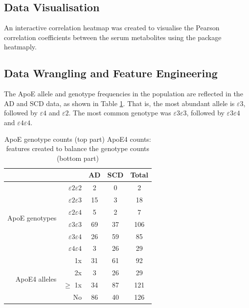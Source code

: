 \documentclass{amsart}
\begin{document}
\subsection{Data Visualisation}
An interactive correlation heatmap was created to visualise the Pearson correlation coefficients between the serum metabolites using the package \textsf{heatmaply}. 

\subsection{Data Wrangling and Feature Engineering}
The ApoE allele and genotype frequencies in the population are reflected in the AD and SCD data, as shown in Table \ref{tab:ApoEfreq}. That is, the most abundant allele is $\varepsilon$3, followed by $\varepsilon4$ and $\varepsilon2$. The most common genotype was $\varepsilon3\varepsilon3$, followed by $\varepsilon3\varepsilon4$ and $\varepsilon4\varepsilon4$.

\begin{table}[htb]
\caption{ApoE genotype counts (top part) ApoE4 counts: features created to balance the genotype counts (bottom part)}
\label{tab:ApoEfreq}
\begin{tabular}{rrccc}
\toprule
\multicolumn{1}{l}{}             & \multicolumn{1}{l}{}       & AD & SCD & Total \\ \midrule
\multirow{6}{*}{ApoE genotypes} & $\varepsilon2\varepsilon$2 & 2  & 0   & 2     \\
                                 & $\varepsilon2\varepsilon3$ & 15 & 3   & 18    \\
                                 & $\varepsilon2\varepsilon4$ & 5  & 2   & 7     \\
                                 & $\varepsilon3\varepsilon3$ & 69 & 37  & 106   \\
                                 & $\varepsilon3\varepsilon4$ & 26 & 59  & 85    \\
                                 & $\varepsilon4\varepsilon4$ & 3  & 26  & 29    \\ \midrule
\multirow{4}{*}{ApoE4 alleles}           & 1x                         & 31 & 61  & 92   \\
                                 & 2x                         & 3  & 26  & 29    \\
                                 & $\geq$ 1x                & 34 & 87  & 121   \\
                                 & No                         & 86 & 40  & 126  \\ \bottomrule
\end{tabular}
\end{table}
\end{document}
